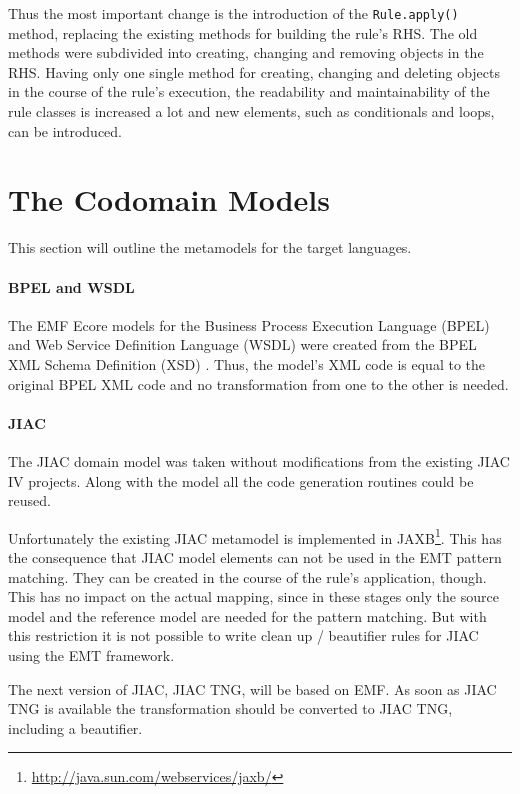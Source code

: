 Thus the most important change is the introduction of the \verb|Rule.apply()| method, replacing the existing methods for building the rule's RHS. The old methods were subdivided into creating, changing and removing objects in the RHS. Having only one single method for creating, changing and deleting objects in the course of the rule's execution, the readability and maintainability of the rule classes is increased a lot and new elements, such as conditionals and loops, can be introduced.



\section{The Codomain Models}

This section will outline the metamodels for the target languages.%

\paragraph*{BPEL and WSDL}

The EMF Ecore models for the Business Process Execution Language (BPEL) and Web Service Definition Language (WSDL) were created from the BPEL XML Schema Definition (XSD) \cite[Appendix D]{spec_bpel}. Thus, the model's XML code is equal to the original BPEL XML code and no transformation from one to the other is needed.

\paragraph*{JIAC}

The JIAC domain model was taken without modifications from the existing JIAC IV projects. Along with the model all the code generation routines could be reused.

Unfortunately the existing JIAC metamodel is implemented in JAXB\footnote{\url{http://java.sun.com/webservices/jaxb/}}. This has the consequence that JIAC model elements can not be used in the EMT pattern matching. They can be created in the course of the rule's application, though. This has no impact on the actual mapping, since in these stages only the source model and the reference model are needed for the pattern matching. But with this restriction it is not possible to write clean up / beautifier rules for JIAC using the EMT framework.

The next version of JIAC, JIAC TNG, will be based on EMF. As soon as JIAC TNG is available the transformation should be converted to JIAC TNG, including a beautifier.

